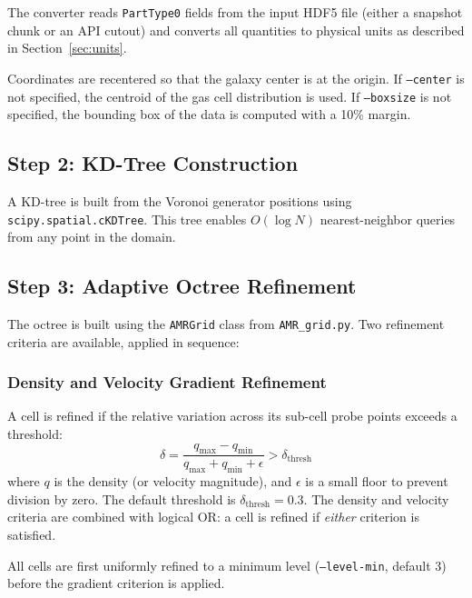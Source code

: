\documentclass[english,a4paper]{my_memo}
\begin{document}
The converter reads \texttt{PartType0} fields from the input HDF5 file
(either a snapshot chunk or an API cutout) and converts all quantities
to physical units as described in Section~\ref{sec:units}.

Coordinates are recentered so that the galaxy center is at the origin.
If \texttt{--center} is not specified, the centroid of the gas cell
distribution is used.  If \texttt{--boxsize} is not specified, the
bounding box of the data is computed with a 10\% margin.

\subsection{Step 2: KD-Tree Construction}

A KD-tree \cite{bentley1975} is built from the Voronoi generator
positions using \texttt{scipy.spatial.cKDTree}.  This tree enables
$O(\log N)$ nearest-neighbor queries from any point in the domain.

\subsection{Step 3: Adaptive Octree Refinement}
\label{sec:refine}

The octree is built using the \texttt{AMRGrid} class from
\texttt{AMR\_grid.py}.  Two refinement criteria are available, applied
in sequence:

\subsubsection{Density and Velocity Gradient Refinement}
\label{sec:refine_gradient}

A cell is refined if the relative variation across its sub-cell probe
points exceeds a threshold:
\begin{equation}
\delta = \frac{q_\mathrm{max} - q_\mathrm{min}}
              {q_\mathrm{max} + q_\mathrm{min} + \epsilon}
       > \delta_\mathrm{thresh}
\end{equation}
where $q$ is the density (or velocity magnitude), and $\epsilon$ is a
small floor to prevent division by zero.  The default threshold is
$\delta_\mathrm{thresh} = 0.3$.  The density and velocity criteria are
combined with logical OR: a cell is refined if \emph{either} criterion
is satisfied.

All cells are first uniformly refined to a minimum level
(\texttt{--level-min}, default 3) before the gradient criterion is
applied.
\end{document}
